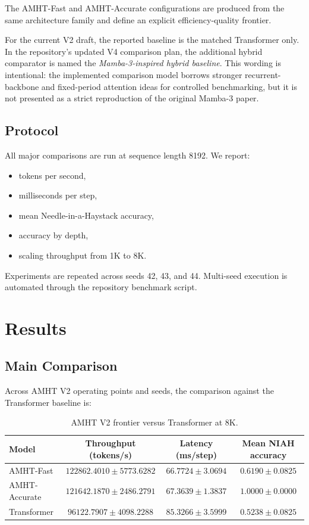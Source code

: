 \documentclass[11pt]{article}
\begin{document}
The AMHT-Fast and AMHT-Accurate configurations are produced from the same architecture family and define an explicit efficiency-quality frontier.

For the current V2 draft, the reported baseline is the matched Transformer only. In the repository's updated V4 comparison plan, the additional hybrid comparator is named the \emph{Mamba-3-inspired hybrid baseline}. This wording is intentional: the implemented comparison model borrows stronger recurrent-backbone and fixed-period attention ideas for controlled benchmarking, but it is not presented as a strict reproduction of the original Mamba-3 paper.

\subsection{Protocol}
All major comparisons are run at sequence length 8192. We report:
\begin{itemize}
  \item tokens per second,
  \item milliseconds per step,
  \item mean Needle-in-a-Haystack accuracy,
  \item accuracy by depth,
  \item scaling throughput from 1K to 8K.
\end{itemize}

Experiments are repeated across seeds 42, 43, and 44. Multi-seed execution is automated through the repository benchmark script.

\section{Results}

\subsection{Main Comparison}
Across AMHT V2 operating points and seeds, the comparison against the Transformer baseline is:

\begin{table}[h]
\centering
\begin{tabular}{lccc}
\toprule
Model & Throughput (tokens/s) & Latency (ms/step) & Mean NIAH accuracy \\
\midrule
AMHT-Fast & $122862.4010 \pm 5773.6282$ & $66.7724 \pm 3.0694$ & $0.6190 \pm 0.0825$ \\
AMHT-Accurate & $121642.1870 \pm 2486.2791$ & $67.3639 \pm 1.3837$ & $1.0000 \pm 0.0000$ \\
Transformer & $96122.7907 \pm 4098.2288$ & $85.3266 \pm 3.5999$ & $0.5238 \pm 0.0825$ \\
\bottomrule
\end{tabular}
\caption{AMHT V2 frontier versus Transformer at 8K.}
\label{tab:main}
\end{table}
\end{document}
